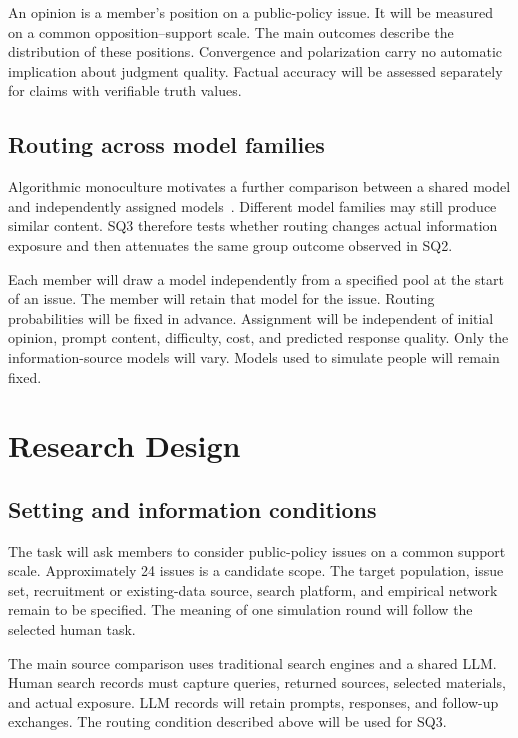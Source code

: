 \documentclass[11pt,a4paper]{article}
\begin{document}
An opinion is a member's position on a public-policy issue. It will be measured on a common opposition--support scale. The main outcomes describe the distribution of these positions. Convergence and polarization carry no automatic implication about judgment quality. Factual accuracy will be assessed separately for claims with verifiable truth values.

\subsection{Routing across model families}

Algorithmic monoculture motivates a further comparison between a shared model and independently assigned models~\citep{kleinberg2021}. Different model families may still produce similar content. SQ3 therefore tests whether routing changes actual information exposure and then attenuates the same group outcome observed in SQ2.

Each member will draw a model independently from a specified pool at the start of an issue. The member will retain that model for the issue. Routing probabilities will be fixed in advance. Assignment will be independent of initial opinion, prompt content, difficulty, cost, and predicted response quality. Only the information-source models will vary. Models used to simulate people will remain fixed.

\section{Research Design}

\subsection{Setting and information conditions}

The task will ask members to consider public-policy issues on a common support scale. Approximately 24 issues is a candidate scope. The target population, issue set, recruitment or existing-data source, search platform, and empirical network remain to be specified. The meaning of one simulation round will follow the selected human task.

The main source comparison uses traditional search engines and a shared LLM. Human search records must capture queries, returned sources, selected materials, and actual exposure. LLM records will retain prompts, responses, and follow-up exchanges. The routing condition described above will be used for SQ3.
\end{document}
